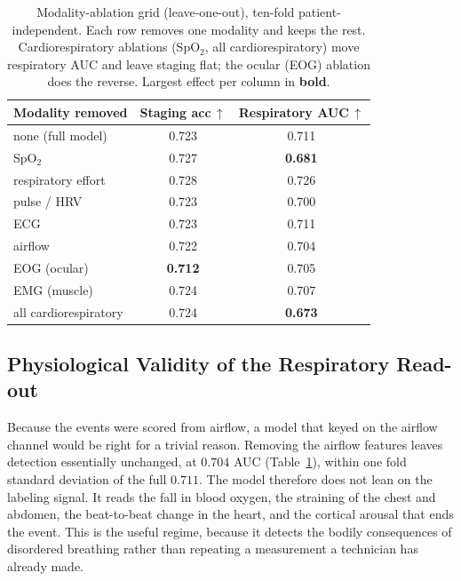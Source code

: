 \documentclass[preprint,12pt]{elsarticle}
\newcommand{\mmAuc}{0.711}
\newcommand{\noflowAuc}{0.704}
\begin{document}
\begin{table}[t]
\caption{Modality-ablation grid (leave-one-out), ten-fold patient-independent. Each row removes
one modality and keeps the rest. Cardiorespiratory ablations (SpO$_2$, all cardiorespiratory)
move respiratory AUC and leave staging flat; the ocular (EOG) ablation does the reverse. Largest
effect per column in \textbf{bold}.}
\label{tab:ablate}
\centering
\setlength{\tabcolsep}{8pt}
\begin{tabular}{lcc}
\toprule
Modality removed & Staging acc\,$\uparrow$ & Respiratory AUC\,$\uparrow$ \\
\midrule
none (full model)        & 0.723 & 0.711 \\
SpO$_2$                  & 0.727 & \textbf{0.681} \\
respiratory effort       & 0.728 & 0.726 \\
pulse / HRV              & 0.723 & 0.700 \\
ECG                      & 0.723 & 0.711 \\
airflow                  & 0.722 & 0.704 \\
EOG (ocular)             & \textbf{0.712} & 0.705 \\
EMG (muscle)             & 0.724 & 0.707 \\
all cardiorespiratory    & 0.724 & \textbf{0.673} \\
\bottomrule
\end{tabular}
\end{table}

\subsection{Physiological Validity of the Respiratory Read-out}
\label{sec:noflow}
Because the events were scored from airflow, a model that keyed on the airflow channel would
be right for a trivial reason. Removing the airflow features leaves detection essentially
unchanged, at $\noflowAuc$ AUC (Table~\ref{tab:ablate}), within one fold standard deviation of
the full $\mmAuc$. The model therefore does not lean on the labeling signal. It reads the fall
in blood oxygen, the straining of the chest and abdomen, the beat-to-beat change in the heart,
and the cortical arousal that ends the event. This is the useful regime, because it detects the
bodily consequences of disordered breathing rather than repeating a measurement a technician
has already made.
\end{document}
